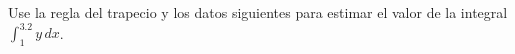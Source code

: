 \item Use la regla del trapecio y los datos siguientes para estimar el valor de la integral $\int_{1}^{3.2} y \, dx$.

